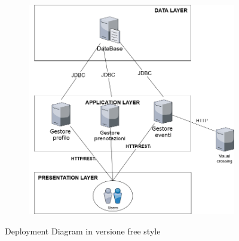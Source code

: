 \begin{figure}[ht!]
    \centering
    \begin{subfigure}{0.9\textwidth}
        \includegraphics[width=\linewidth]{Iterazione 0/immagini/DeployementFreeStyle(1).png}
    \end{subfigure}
    \caption{Deployment Diagram in versione free style}
    \label{fig:DeployementFreeStyle}
\end{figure}
